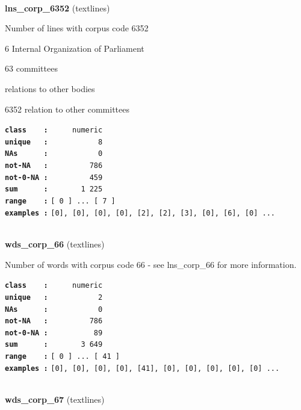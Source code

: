 \documentclass[]{article}
\begin{document}
~

\textbf{lns\_corp\_6352} (textlines)

Number of lines with corpus code 6352

6 Internal Organization of Parliament

63 committees

relations to other bodies

6352 relation to other committees

\textbf{\texttt{class\ \ \ \ :}} \texttt{~~~~~numeric}\\
\textbf{\texttt{unique\ \ \ :}} \texttt{~~~~~~~~~~~8}\\
\textbf{\texttt{NAs\ \ \ \ \ \ :}} \texttt{~~~~~~~~~~~0}\\
\textbf{\texttt{not-NA\ \ \ :}} \texttt{~~~~~~~~~786}\\
\textbf{\texttt{not-0-NA\ :}} \texttt{~~~~~~~~~459}\\
\textbf{\texttt{sum\ \ \ \ \ \ :}} \texttt{~~~~~~~1~225}\\
\textbf{\texttt{range\ \ \ \ :}}
\texttt{{[}\ 0\ {]}\ ...\ {[}\ 7\ {]}}\\
\textbf{\texttt{examples\ :}}
\texttt{{[}0{]},\ {[}0{]},\ {[}0{]},\ {[}0{]},\ {[}2{]},\ {[}2{]},\ {[}3{]},\ {[}0{]},\ {[}6{]},\ {[}0{]}\ ...}\\

~

\textbf{wds\_corp\_66} (textlines)

Number of words with corpus code 66 - see lns\_corp\_66 for more
information.

\textbf{\texttt{class\ \ \ \ :}} \texttt{~~~~~numeric}\\
\textbf{\texttt{unique\ \ \ :}} \texttt{~~~~~~~~~~~2}\\
\textbf{\texttt{NAs\ \ \ \ \ \ :}} \texttt{~~~~~~~~~~~0}\\
\textbf{\texttt{not-NA\ \ \ :}} \texttt{~~~~~~~~~786}\\
\textbf{\texttt{not-0-NA\ :}} \texttt{~~~~~~~~~~89}\\
\textbf{\texttt{sum\ \ \ \ \ \ :}} \texttt{~~~~~~~3~649}\\
\textbf{\texttt{range\ \ \ \ :}}
\texttt{{[}\ 0\ {]}\ ...\ {[}\ 41\ {]}}\\
\textbf{\texttt{examples\ :}}
\texttt{{[}0{]},\ {[}0{]},\ {[}0{]},\ {[}0{]},\ {[}41{]},\ {[}0{]},\ {[}0{]},\ {[}0{]},\ {[}0{]},\ {[}0{]}\ ...}\\

~

\textbf{wds\_corp\_67} (textlines)
\end{document}
